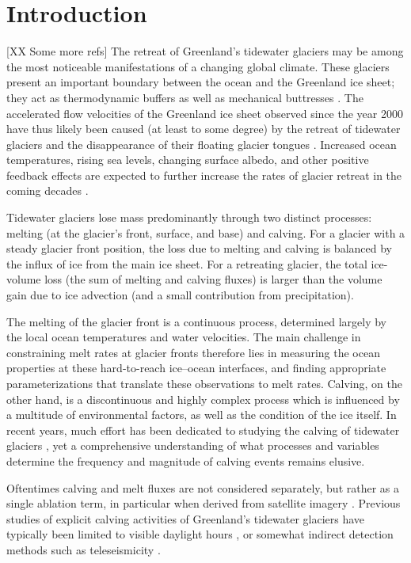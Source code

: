 \documentclass[10pt,letterpaper]{article}
\begin{document}
\section{Introduction}
 
[XX Some more refs] The retreat of Greenland's tidewater glaciers may be among the most noticeable manifestations of a changing global climate. These glaciers present an important boundary between the ocean and the Greenland ice sheet; they act as thermodynamic buffers as well as mechanical buttresses \citep[e.g.,][]{Rignot:2002kz, Howat:2007di, Nick:2009gz}. The accelerated flow velocities of the Greenland ice sheet observed since the year 2000 \citep{Howat:2008hp, Moon:2012iy} have thus likely been caused (at least to some degree) by the retreat of tidewater glaciers and the disappearance of their floating glacier tongues \cite{Wilson:2017bh}. Increased ocean temperatures, rising sea levels, changing surface albedo, and other positive feedback effects are expected to further increase the rates of glacier retreat in the coming decades \citep[e.g.,][]{Vieli:2011hw, Joughin:2012hc, Nick:2013jp}. 

Tidewater glaciers lose mass predominantly through two distinct processes: melting (at the glacier's front, surface, and base) and calving. For a glacier with a steady glacier front position, the loss due to melting and calving is balanced by the influx of ice from the main ice sheet. For a retreating glacier, the total ice-volume loss (the sum of melting and calving fluxes) is larger than the volume gain due to ice advection (and a small contribution from precipitation). 

The melting of the glacier front is a continuous process, determined largely by the local ocean temperatures and water velocities. The main challenge in constraining melt rates at glacier fronts therefore lies in measuring the ocean properties at these hard-to-reach ice--ocean interfaces, and finding appropriate parameterizations that translate these observations to melt rates.  Calving, on the other hand, is a discontinuous and highly complex process which is influenced by a multitude of environmental factors, as well as the condition of the ice itself. In recent years, much effort has been dedicated to studying the calving of tidewater glaciers \cite[see the review by][]{Benn:2007hn}, yet a comprehensive understanding of what processes and variables determine the frequency and magnitude of calving events remains elusive. 

Oftentimes calving and melt fluxes are not considered separately, but rather as a single ablation term, in particular when derived from satellite imagery \cite{Luckman:2015ip}. Previous studies of explicit calving activities of Greenland's tidewater glaciers have typically been limited to visible daylight hours \citep[see, for example, the calving event catalogue of][]{Astrom:2014ee}, or somewhat indirect detection methods such as teleseismicity \citep{Veitch:2012hn}. 
\end{document}

